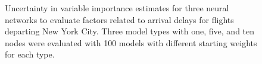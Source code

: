 \documentclass[article,shortnames]{jss}\usepackage[]{graphicx}\usepackage[]{color}
\begin{document}
\begin{figure}
\centering
{}


\caption{Uncertainty in variable importance estimates for three neural networks to evaluate factors related to arrival delays for flights departing New York City.  Three model types with one, five, and ten nodes were evaluated with 100 models with different starting weights for each type.}
\label{fig:flightimp}
\end{figure}
\end{document}
